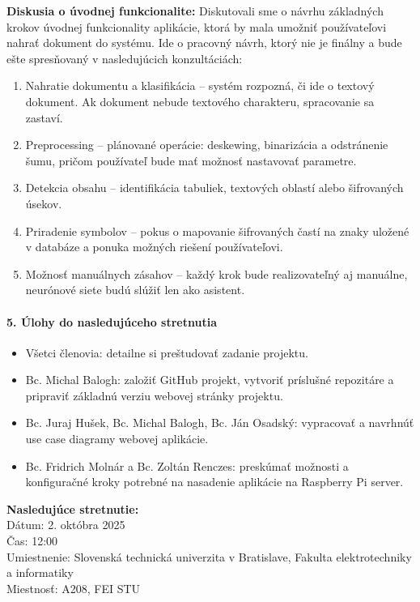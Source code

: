 \textbf{Diskusia o úvodnej funkcionalite:}  
Diskutovali sme o návrhu základných krokov úvodnej funkcionality aplikácie, ktorá by mala umožniť používateľovi nahrať dokument do systému. Ide o pracovný návrh, ktorý nie je finálny a bude ešte spresňovaný v nasledujúcich konzultáciách:
\begin{enumerate}
    \item Nahratie dokumentu a klasifikácia – systém rozpozná, či ide o textový dokument. Ak dokument nebude textového charakteru, spracovanie sa zastaví.
    \item Preprocessing – plánované operácie: deskewing, binarizácia a odstránenie šumu, pričom používateľ bude mať možnosť nastavovať parametre.
    \item Detekcia obsahu – identifikácia tabuliek, textových oblastí alebo šifrovaných úsekov.
    \item Priradenie symbolov – pokus o mapovanie šifrovaných častí na znaky uložené v databáze a ponuka možných riešení používateľovi.
    \item Možnosť manuálnych zásahov – každý krok bude realizovateľný aj manuálne, neurónové siete budú slúžiť len ako asistent.
\end{enumerate}

\paragraph{5. Úlohy do nasledujúceho stretnutia}
\begin{itemize}
    \item Všetci členovia: detailne si preštudovať zadanie projektu.
    \item Bc. Michal Balogh: založiť GitHub projekt, vytvoriť príslušné repozitáre a pripraviť základnú verziu webovej stránky projektu.
    \item Bc. Juraj Hušek, Bc. Michal Balogh, Bc. Ján Osadský: vypracovať a navrhnúť use case diagramy webovej aplikácie.
    \item Bc. Fridrich Molnár a Bc. Zoltán Renczes: preskúmať možnosti a konfiguračné kroky potrebné na nasadenie aplikácie na Raspberry Pi server.
\end{itemize}

\vspace{0.5cm}
\textbf{Nasledujúce stretnutie:} \\
Dátum: 2. októbra 2025 \\
Čas: 12:00 \\
Umiestnenie: Slovenská technická univerzita v Bratislave, Fakulta elektrotechniky a informatiky \\
Miestnosť: A208, FEI STU

